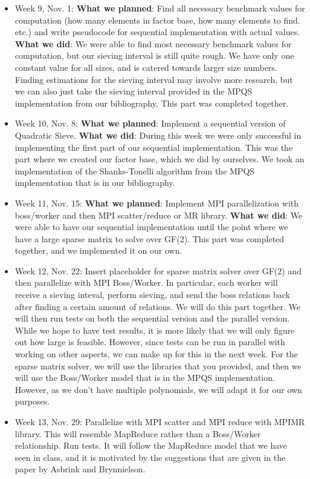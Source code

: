 \documentclass[11pt]{article}
\begin{document}
\begin{itemize}
 \item Week 9, Nov. 1: \textbf{What we planned}: Find all necessary benchmark values for computation (how many elements in factor base, how many elements to find. etc.) and write pseudocode for sequential implementation with actual values. \textbf{What we did}: We were able to find most necessary benchmark values for computation, but our sieving interval is still quite rough. We have only one constant value for all sizes, and is catered towards larger size numbers. Finding estimations for the sieving interval may involve more research, but we can also just take the sieving interval provided in the MPQS implementation from our bibliography. This part was completed together.
 \item Week 10, Nov. 8: \textbf{What we planned}: Implement a sequential version of Quadratic Sieve. \textbf{What we did}: During this week we were only successful in implementing the first part of our sequential implementation. This was the part where we created our factor base, which we did by ourselves. We took an implementation of the Shanks-Tonelli algorithm from the MPQS implementation that is in our bibliography.
 \item Week 11, Nov. 15: \textbf{What we planned}: Implement MPI parallelization with boss/worker and then MPI scatter/reduce or MR library. \textbf{What we did}: We were able to have our sequential implementation until the point where we have a large sparse matrix to solve over GF(2). This part was completed together, and we implemented it on our own.
 \item Week 12, Nov. 22: Insert placeholder for sparse matrix solver over GF(2) and then parallelize with MPI Boss/Worker. In particular, each worker will receive a sieving inteval, perform sieving, and send the boss relations back after finding a certain amount of relations. We will do this part together. We will then run tests on both the sequential version and the parallel version. While we hope to have test results, it is more likely that we will only figure out how large is feasible. However, since tests can be run in parallel with working on other aspects, we can make up for this in the next week. For the sparse matrix solver, we will use the libraries that you provided, and then we will use the Boss/Worker model that is in the MPQS implementation. However, as we don't have multiple polynomials, we will adapt it for our own purposes.
 \item Week 13, Nov. 29: Parallelize with MPI scatter and MPI reduce with MPIMR library. This will resemble MapReduce rather than a Boss/Worker relationship. Run tests. It will follow the MapReduce model that we have seen in class, and it is motivated by the suggestions that are given in the paper by Asbrink and Brynnielson.

\end{itemize}
\end{document}
